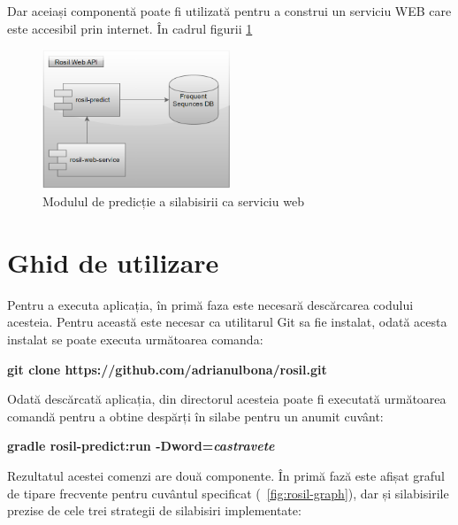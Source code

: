 Dar aceiași componentă poate fi utilizată pentru a construi un serviciu WEB care este accesibil prin internet. În cadrul figurii \ref{fig:rosil-service}

\begin{figure}[h!]
    \centering
    \includegraphics[width=0.50\textwidth]{figures/rosil-service.png}
    \caption{Modulul de predicție a silabisirii ca serviciu web}
    \label{fig:rosil-service}
\end{figure}

\section{Ghid de utilizare}

Pentru a executa aplicația, în primă faza este necesară descărcarea codului acesteia. Pentru această este necesar ca utilitarul Git sa fie instalat, odată acesta instalat se poate executa următoarea comanda:

\begin{center}
\textbf{git clone https://github.com/adrianulbona/rosil.git}
\end{center} 

Odată descărcată aplicația, din directorul acesteia poate fi executată următoarea comandă pentru a obtine despărți în silabe pentru un anumit cuvânt:

\begin{center}
\textbf{gradle rosil-predict:run -Dword=\textit{castravete}}
\end{center} 

Rezultatul acestei comenzi are două componente. În primă fază este afișat graful de tipare frecvente pentru cuvântul specificat (~\ref{fig:rosil-graph}), dar și silabisirile prezise de cele trei strategii de silabisiri implementate:

